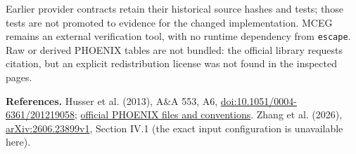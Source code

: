 \documentclass[10pt,a4paper]{article}
\begin{document}
Earlier provider contracts retain their historical source hashes and tests;
those tests are not promoted to evidence for the changed implementation.
MCEG remains an external verification tool, with no runtime dependency from
\texttt{escape}. Raw or derived PHOENIX tables are not bundled: the official
library requests citation, but an explicit redistribution license was not
found in the inspected pages.

\small
\textbf{References.}
Husser et al. (2013), A\&A 553, A6,
\href{https://doi.org/10.1051/0004-6361/201219058}{doi:10.1051/0004-6361/201219058};
\href{https://phoenix.astro.physik.uni-goettingen.de/spectra/}{official PHOENIX files and conventions}.
Zhang et al. (2026), \href{https://arxiv.org/abs/2606.23899v1}{arXiv:2606.23899v1},
Section IV.1 (the exact input configuration is unavailable here).
\end{document}
